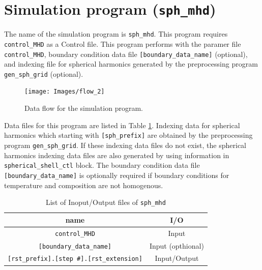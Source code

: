 \newpage
%

\section{Simulation program ({\tt sph\_mhd})}
\label{section:sph_mhd}
%

The name of the simulation program is {\tt sph\_mhd}. This program requires {\tt control\_MHD} as a Control file. This program performs with the paramer file {\tt control\_MHD}, boundary condition data file \verb|[boundary_data_name]| (optional), and  indexing file for spherical harmonics generated by the preprocessing program {\tt gen\_sph\_grid} (optional).
%
\begin{figure}[htbp]
\begin{center}
\texttt{[image: Images/flow\_2]}
\end{center}
\caption{Data flow for the simulation program.}
\label{fig:flow_2}
\end{figure}
%
Data files for this program are listed in Table \ref{table:sph_mhd}. Indexing data for spherical harmonics which starting with \verb|[sph_prefix]| are obtained by the preprocessing program \verb|gen_sph_grid|. If these indexing data files do not exist, the spherical harmonics indexing data files are also generated by using information in \verb|spherical_shell_ctl| block. The boundary condition data file \verb|[boundary_data_name]| is optionally required if boundary conditions for temperature and composition are not homogenous.
%
\begin{table}[htp]
\caption{List of Inoput/Output files of {\tt sph\_mhd} }
\begin{center} 
\begin{tabular}{|c|c|}
\hline
 name  & I/O \\ \hline \hline
\verb|control_MHD| & Input \\ \hline
\verb|[boundary_data_name]| & Input (opthional) \\ \hline
\verb|[rst_prefix].[step #].[rst_extension]| & Input/Output  \\ \hline
\end{tabular}
\end{center}
\label{table:sph_mhd}
\end{table}
%
